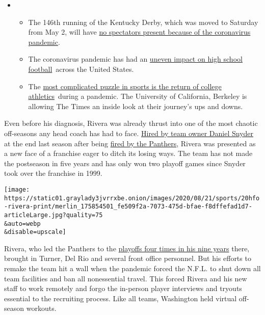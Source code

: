 \begin{itemize}
\item
  \begin{itemize}
  \tightlist
  \item
    The 146th running of the Kentucky Derby, which was moved to Saturday
    from May 2, will have
    \href{https://www.nytimes3xbfgragh.onion/2020/09/04/sports/horse-racing/kentucky-derby-odds-picks.html?action=click\&pgtype=Article\&state=default\&region=MAIN_CONTENT_2\&context=storylines_keepup}{no
    spectators present because of the coronavirus pandemic}.
  \item
    The coronavirus pandemic has had an
    \href{https://www.nytimes3xbfgragh.onion/2020/09/03/sports/ncaafootball/high-school-football-coronavirus-pandemic.html?action=click\&pgtype=Article\&state=default\&region=MAIN_CONTENT_2\&context=storylines_keepup}{uneven
    impact on high school football}~across the United States.
  \item
    The
    \href{https://www.nytimes3xbfgragh.onion/2020/09/02/sports/ncaafootball/coronavirus-cal-athletics-season.html?action=click\&pgtype=Article\&state=default\&region=MAIN_CONTENT_2\&context=storylines_keepup}{most
    complicated puzzle in sports is the return of college
    athletics}~during a pandemic. The University of California, Berkeley
    is allowing The Times an inside look at their journey's ups and
    downs.
  \end{itemize}
\end{itemize}

Even before his diagnosis, Rivera was already thrust into one of the
most chaotic off-seasons any head coach has had to face.
\href{https://www.nytimes3xbfgragh.onion/2019/12/31/sports/football/ron-rivera-washington-redskins.html}{Hired
by team owner Daniel Snyder} at the end last season after being
\href{https://www.nytimes3xbfgragh.onion/2019/12/04/sports/football/why-was-ron-rivera-fired.html}{fired
by the Panthers}, Rivera was presented as a new face of a franchise
eager to ditch its losing ways. The team has not made the postseason in
five years and has only won two playoff games since Snyder took over the
franchise in 1999.

\texttt{[image: https://static01.graylady3jvrrxbe.onion/images/2020/08/21/sports/20hfo-rivera-print/merlin\_175854501\_fe509f2a-7073-475d-bfae-f8dffefad1d7-articleLarge.jpg?quality=75\\\&auto=webp\\\&disable=upscale]}

Rivera, who led the Panthers to the
\href{https://www.pro-football-reference.com/coaches/RiveRo0.htm}{playoffs
four times in his nine years} there, brought in Turner, Del Rio and
several front office personnel. But his efforts to remake the team hit a
wall when the pandemic forced the N.F.L. to shut down all team
facilities and ban all nonessential travel. This forced Rivera and his
new staff to work remotely and forgo the in-person player interviews and
tryouts essential to the recruiting process. Like all teams, Washington
held virtual off-season workouts.

